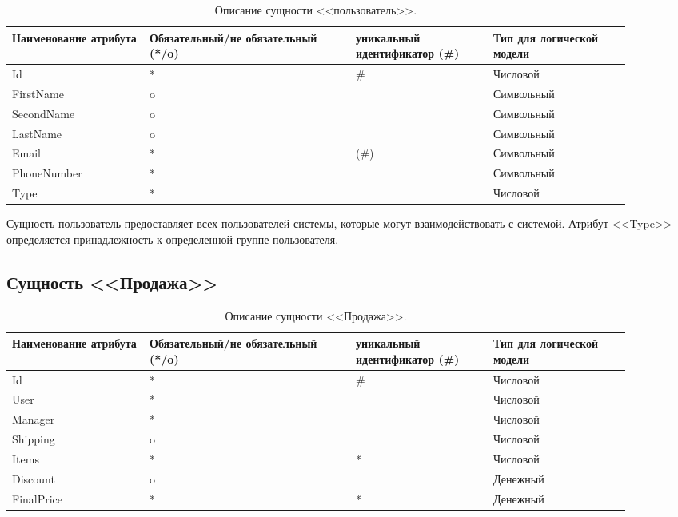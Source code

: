 \documentclass[14pt]{extreport}
\begin{document}
            \begin{table}[H]
                \begin{tabular}{|p{0.2\linewidth}|p{0.3\linewidth}|p{0.2\linewidth}|p{0.2\linewidth}|}
                    \hline
                    Наименование атрибута & Обязательный/не обязательный (*/o) & уникальный идентификатор (\#) & Тип для логической модели
                    \\ \hline
                    Id & * & \# & Числовой \\ \hline
                    FirstName & o & & Символьный\\ \hline
                    SecondName & o & & Символьный\\ \hline
                    LastName & o & & Символьный \\ \hline
                    Email & * & (\#) & Символьный  \\ \hline
                    PhoneNumber & * & & Символьный\\ \hline
                    Type & * & & Числовой \\ \hline
                \end{tabular}

                \caption{Описание сущности <<пользователь>>.}
            \end{table}
        
        Сущность пользователь предоставляет всех пользователей системы, которые могут взаимодействовать с системой. Атрибут <<Type>> определяется принадлежность к определенной группе пользователя.

    \subsection*{Сущность <<Продажа>>}

        \begin{table}[H]
            \begin{tabular}{|p{0.2\linewidth}|p{0.3\linewidth}|p{0.2\linewidth}|p{0.2\linewidth}|}
                \hline
                Наименование атрибута & Обязательный/не обязательный (*/o) & уникальный идентификатор (\#) & Тип для логической модели
                \\ \hline
                Id & * & \# & Числовой \\ \hline
                User & * & & Числовой\\ \hline
                Manager & * & & Числовой\\ \hline
                Shipping & o & & Числовой \\ \hline
                Items & * & * & Числовой  \\ \hline
                Discount & o & & Денежный \\ \hline  
                FinalPrice & * & * & Денежный \\ \hline
            \end{tabular}
            \caption{Описание сущности <<Продажа>>.}
        \end{table}
\end{document}
